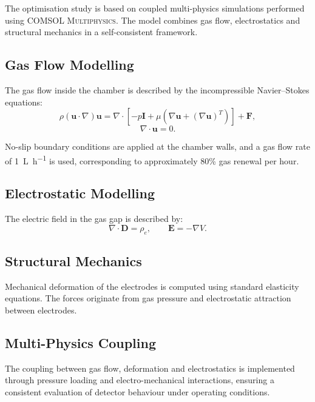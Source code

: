 The optimisation study is based on coupled multi-physics simulations
performed using \textsc{COMSOL Multiphysics}. The model combines gas
flow, electrostatics and structural mechanics in a self-consistent
framework.

\subsection{Gas Flow Modelling}

The gas flow inside the chamber is described by the incompressible
Navier--Stokes equations:
\begin{equation}
\rho(\boldsymbol{u}\cdot\nabla)\boldsymbol{u}
= \nabla\cdot\left[-p\boldsymbol{I}
+ \mu(\nabla\boldsymbol{u}+(\nabla\boldsymbol{u})^{T})\right]
+ \boldsymbol{F},
\end{equation}
\begin{equation}
\nabla\cdot\boldsymbol{u} = 0.
\end{equation}

No-slip boundary conditions are applied at the chamber walls, and a
gas flow rate of \SI{1}{\liter\per\hour} is used, corresponding to
approximately 80\% gas renewal per hour.

\subsection{Electrostatic Modelling}

The electric field in the gas gap is described by:
\begin{equation}
\nabla\cdot\boldsymbol{D} = \rho_e, \qquad
\boldsymbol{E} = -\nabla V.
\end{equation}

\subsection{Structural Mechanics}

Mechanical deformation of the electrodes is computed using standard
elasticity equations. The forces originate from gas pressure and
electrostatic attraction between electrodes.

\subsection{Multi-Physics Coupling}

The coupling between gas flow, deformation and electrostatics is
implemented through pressure loading and electro-mechanical
interactions, ensuring a consistent evaluation of detector
behaviour under operating conditions.

